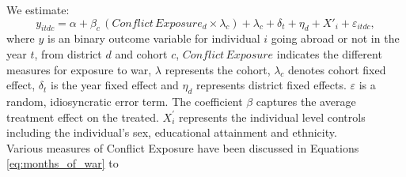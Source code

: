 \label{sec:methods}

We estimate:
\begin{equation}
y_{itdc} = \alpha + \beta_{c}\,(Conflict\,Exposure_{d}\times \lambda_{c}) + \lambda_{c} + \delta_t + \eta_{d} + X'_{i} + \varepsilon_{itdc},
\label{eq:did}
\end{equation}
where $y$ is an binary outcome variable for individual $i$ going abroad or not in the year $t$, from district $d$ and cohort $c$, $Conflict \, Exposure$ indicates the different measures for exposure to war, $\lambda$ represents the cohort,  $\lambda_{c}$ denotes cohort fixed effect, $\delta_{t}$ is the year fixed effect and $\eta_{d}$ represents district fixed effects. $\varepsilon$ is a random, idiosyncratic error term. The coefficient $\beta$ captures the average treatment effect on the treated. $X^{'}_{i}$ represents the individual level controls including the individual's sex, educational attainment and ethnicity. \\
Various measures of Conflict Exposure have been discussed in Equations \ref{eq:months_of_war} to 


